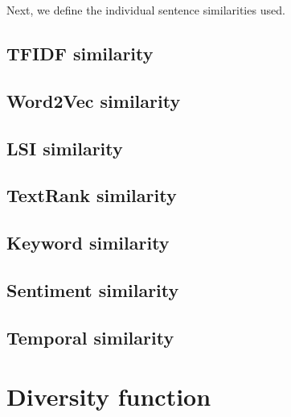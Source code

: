 Next, we define the individual sentence similarities used.

\subsection{TFIDF similarity}

\subsection{Word2Vec similarity}

\subsection{LSI similarity}

\subsection{TextRank similarity}

\subsection{Keyword similarity}

\subsection{Sentiment similarity}

\subsection{Temporal similarity}


\section{Diversity function}